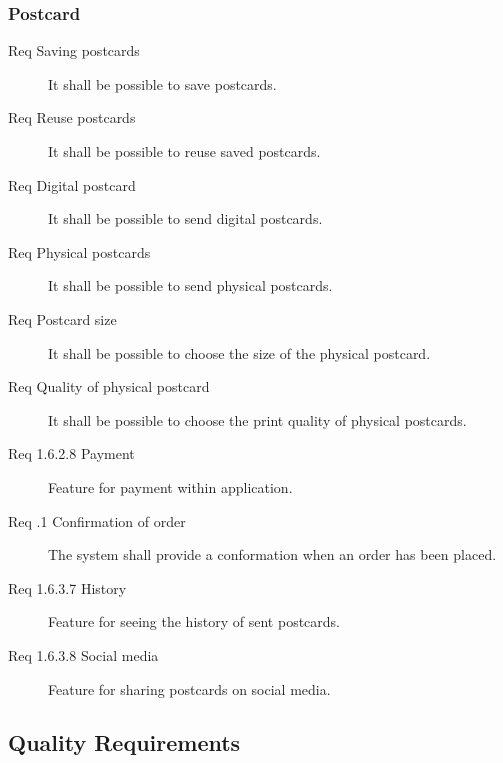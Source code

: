 \documentclass[10pt,a4paper]{article}
\begin{document}
\subsubsection{Postcard}
\begin{description}
\item [Req  Saving postcards] It shall be possible to save postcards.
\item [Req  Reuse postcards] It shall be possible to reuse saved postcards.
\item [Req  Digital postcard] It shall be possible to send digital postcards.
\item [Req  Physical postcards] It shall be possible to send physical postcards.
\item [Req  Postcard size] It shall be possible to choose the size of the physical postcard.
\item [Req  Quality of physical postcard] It shall be possible to choose the print quality of physical postcards. 
\end{description}

\begin{description}
\item [Req 1.6.2.8 Payment] Feature for payment within application.

\item [Req \thesubsubsection .1 Confirmation of order] The system shall provide a conformation when an order has been placed.
\item [Req 1.6.3.7 History] Feature for seeing the history of sent postcards.
\item [Req 1.6.3.8 Social media] Feature for sharing postcards on social media.
\end {description}

\subsection{Quality Requirements}







\end{document}
